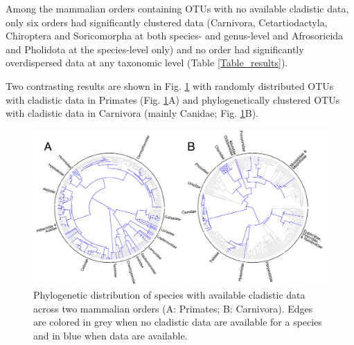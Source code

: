 

Among the mammalian orders containing OTUs with no available cladistic data, only six orders had significantly clustered data (Carnivora, Cetartiodactyla, Chiroptera and Soricomorpha at both species- and genus-level and Afrosoricida and Pholidota at the species-level only) and no order had significantly overdispersed data at any taxonomic level (Table \ref{Table_results}).

Two contrasting results are shown in Fig. \ref{Figure_example_coverage} with randomly distributed OTUs with cladistic data in Primates (Fig. \ref{Figure_example_coverage}A) and phylogenetically clustered OTUs with cladistic data in Carnivora (mainly Canidae; Fig. \ref{Figure_example_coverage}B).

\begin{figure}[!h]
\centering
    \includegraphics[width=1\textwidth]{Missing_mammals/Figures/example_coverage.pdf}
\caption[Phylogenetic distribution of species with available cladistic data across Primates and Carnivora]{Phylogenetic distribution of species with available cladistic data across two mammalian orders (A: Primates; B: Carnivora).
Edges are colored in grey when no cladistic data are available for a species and in blue when data are available.}
\label{Figure_example_coverage}
\end{figure}

%
%

